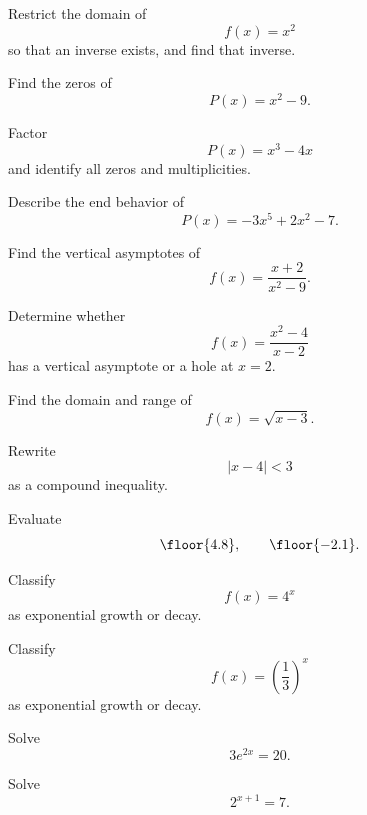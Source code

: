 \begin{exercise}[2]
Restrict the domain of
\[ f(x)=x^2 \]
so that an inverse exists, and find that inverse.
\end{exercise}

\begin{exercise}[1]
Find the zeros of
\[ P(x)=x^2-9. \]
\end{exercise}

\begin{exercise}[2]
Factor
\[ P(x)=x^3-4x \]
and identify all zeros and multiplicities.
\end{exercise}

\begin{exercise}[2]
Describe the end behavior of
\[ P(x)=-3x^5+2x^2-7. \]
\end{exercise}

\begin{exercise}[2]
Find the vertical asymptotes of
\[ f(x)=\frac{x+2}{x^2-9}. \]
\end{exercise}

\begin{exercise}[2]
Determine whether
\[ f(x)=\frac{x^2-4}{x-2} \]
has a vertical asymptote or a hole at \(x=2\).
\end{exercise}

\begin{exercise}[1]
Find the domain and range of
\[ f(x)=\sqrt{x-3}. \]
\end{exercise}

\begin{exercise}[2]
Rewrite
\[ |x-4|<3 \]
as a compound inequality.
\end{exercise}

\begin{exercise}[1]
Evaluate
\[ \floor{4.8},\qquad \floor{-2.1}. \]
\end{exercise}

\begin{exercise}[1]
Classify
\[ f(x)=4^x \]
as exponential growth or decay.
\end{exercise}

\begin{exercise}[1]
Classify
\[ f(x)=\left(\frac13\right)^x \]
as exponential growth or decay.
\end{exercise}

\begin{exercise}[2]
Solve
\[ 3e^{2x}=20. \]
\end{exercise}

\begin{exercise}[2]
Solve
\[ 2^{x+1}=7. \]
\end{exercise}

